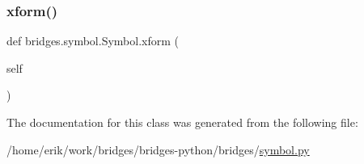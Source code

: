 \subsubsection{\texorpdfstring{xform()}{xform()}}
{\footnotesize\ttfamily def bridges.\+symbol.\+Symbol.\+xform (\begin{DoxyParamCaption}\item[{}]{self }\end{DoxyParamCaption})}



The documentation for this class was generated from the following file\+:\begin{DoxyCompactItemize}
\item 
/home/erik/work/bridges/bridges-\/python/bridges/\hyperlink{symbol_8py}{symbol.\+py}\end{DoxyCompactItemize}
